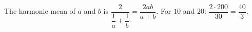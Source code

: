 The harmonic mean of $a$ and $b$ is $\dfrac{2}{\dfrac{1}{a}+\dfrac{1}{b}}=\dfrac{2ab}{a+b}$. For $10$ and $20$: $\dfrac{2\cdot200}{30}=\boxed{\dfrac{40}{3}}$.
